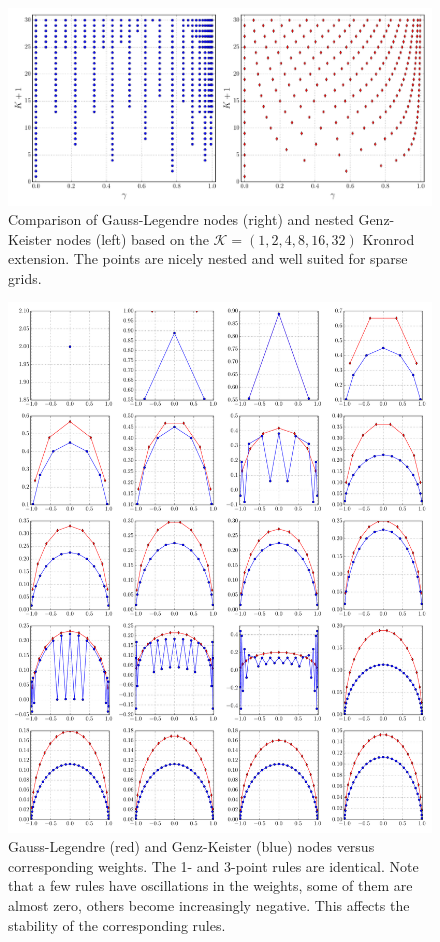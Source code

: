 \documentclass[a4paper,10pt]{article}
\begin{document}
\begin{figure}
  \centering
  \includegraphics[width=\linewidth]{./img/gk_legendre_nodes_cmp.pdf}
  \caption{Comparison of Gauss-Legendre nodes (right) and nested Genz-Keister nodes (left)
  based on the $\mathcal{K} = (1,2,4,8,16,32)$ Kronrod extension. The points are
  nicely nested and well suited for sparse grids.}
  \label{fig:gk_legendre_nodes_cmp}
\end{figure}

\begin{figure}
  \centering
  \includegraphics[width=\linewidth]{./img/gk_legendre_nodes_1d.pdf}
  \caption{Gauss-Legendre (red) and Genz-Keister (blue) nodes versus
  corresponding weights. The 1- and 3-point rules are identical.
  Note that a few rules have oscillations in the weights, some of them
  are almost zero, others become increasingly negative. This affects the
  stability of the corresponding rules.}
  \label{fig:gk_legendre_nodes_1d}
\end{figure}
\end{document}
